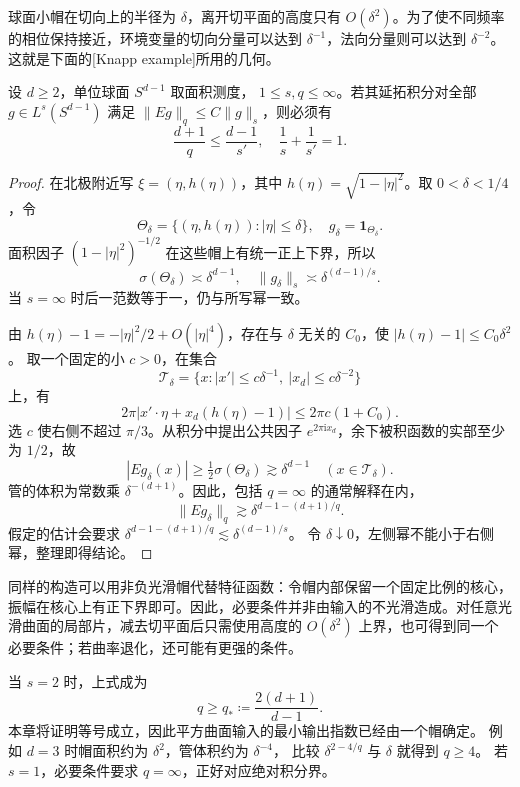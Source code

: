 球面小帽在切向上的半径为 \(\delta\)，离开切平面的高度只有
\(O(\delta^2)\)。为了使不同频率的相位保持接近，环境变量的切向分量可以达到
\(\delta^{-1}\)，法向分量则可以达到 \(\delta^{-2}\)。
这就是下面的[Knapp example]所用的几何。

\begin{proposition}[帽与管的必要条件]\label{b2:prop:23-knapp}
设 \(d\geq2\)，单位球面 \(S^{d-1}\) 取面积测度，
\(1\leq s,q\leq\infty\)。若其延拓积分对全部
\(g\in L^s(S^{d-1})\) 满足
\(\|Eg\|_q\leq C\|g\|_s\)，则必须有
\[
 \frac{d+1}{q}\leq\frac{d-1}{s'},
 \quad \frac1s+\frac1{s'}=1.
\]
\end{proposition}
\begin{proof}
在北极附近写
\(\xi=(\eta,h(\eta))\)，其中
\(h(\eta)=\sqrt{1-|\eta|^2}\)。取 \(0<\delta<1/4\)，令
\[
 \Theta_\delta=\{(\eta,h(\eta)):|\eta|\leq\delta\},
 \quad g_\delta=\mathbf1_{\Theta_\delta}.
\]
面积因子 \((1-|\eta|^2)^{-1/2}\) 在这些帽上有统一正上下界，所以
\[
 \sigma(\Theta_\delta)\asymp\delta^{d-1},\quad
 \|g_\delta\|_s\asymp\delta^{(d-1)/s}.
\]
当 \(s=\infty\) 时后一范数等于一，仍与所写幂一致。

由 \(h(\eta)-1=-|\eta|^2/2+O(|\eta|^4)\)，存在与 \(\delta\)
无关的 \(C_0\)，使 \(|h(\eta)-1|\leq C_0\delta^2\)。
取一个固定的小 \(c>0\)，在集合
\[
 \mathcal T_\delta=
 \{x:|x'|\leq c\delta^{-1},\ |x_d|\leq c\delta^{-2}\}
\]
上，有
\[
 2\pi|x'\cdot\eta+x_d(h(\eta)-1)|
       \leq 2\pi c(1+C_0).
\]
选 \(c\) 使右侧不超过 \(\pi/3\)。从积分中提出公共因子
\(e^{2\pi\mathrm i x_d}\)，余下被积函数的实部至少为 \(1/2\)，故
\[
 |Eg_\delta(x)|\geq\tfrac12\sigma(\Theta_\delta)
       \gtrsim\delta^{d-1}\quad(x\in\mathcal T_\delta).
\]
管的体积为常数乘 \(\delta^{-(d+1)}\)。因此，包括 \(q=\infty\)
的通常解释在内，
\[
 \|Eg_\delta\|_q\gtrsim
       \delta^{d-1-(d+1)/q}.
\]
假定的估计会要求
\(\delta^{d-1-(d+1)/q}\lesssim\delta^{(d-1)/s}\)。
令 \(\delta\downarrow0\)，左侧幂不能小于右侧幂，整理即得结论。
\end{proof}

同样的构造可以用非负光滑帽代替特征函数：令帽内部保留一个固定比例的核心，振幅在核心上有正下界即可。因此，必要条件并非由输入的不光滑造成。对任意光滑曲面的局部片，减去切平面后只需使用高度的 \(O(\delta^2)\) 上界，也可得到同一个必要条件；若曲率退化，还可能有更强的条件。

\ProseParagraphBreak
当 \(s=2\) 时，上式成为
\[
 q\geq q_*\coloneqq\frac{2(d+1)}{d-1}.
\]
本章将证明等号成立，因此平方曲面输入的最小输出指数已经由一个帽确定。
例如 \(d=3\) 时帽面积约为 \(\delta^2\)，管体积约为 \(\delta^{-4}\)，
比较 \(\delta^{2-4/q}\) 与 \(\delta\) 就得到 \(q\geq4\)。
若 \(s=1\)，必要条件要求 \(q=\infty\)，正好对应绝对积分界。

